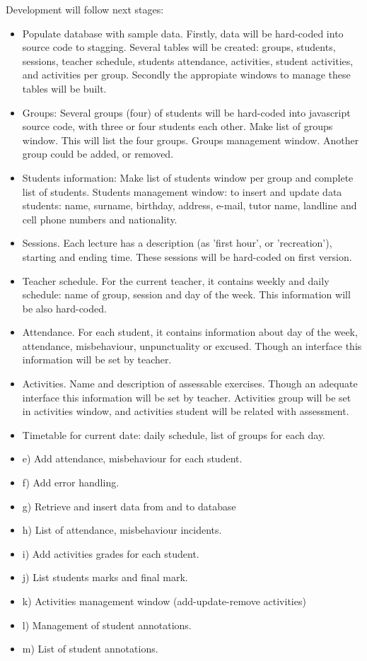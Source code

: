 		
  Development will follow next stages:
	\begin{itemize}
  \item   Populate database with sample data. Firstly, data will be hard-coded into source code to stagging. Several tables will be created:
  groups, students, sessions, teacher schedule, students attendance, activities, student activities, and activities per group. Secondly 
  the appropiate windows to manage these tables will be built.
  \item   Groups: Several groups (four) of students will be hard-coded into javascript source code, with three or four students each other.
  \subitem  Make list of groups window. This will list the four groups.
  \subitem  Groups management window. Another group could be added, or removed.
  \item  Students information:
  \subitem   Make list of students window per group and complete list of students. 
  \subitem   Students management window: to insert and update data students: name, surname, birthday, address, e-mail,  tutor name,
    landline and cell phone numbers and nationality.
  \item  Sessions. Each lecture has a description (as 'first hour', or 'recreation'), starting and ending time.  These sessions will be hard-coded on first version.
  \item  Teacher schedule. For the current teacher, it contains weekly and daily schedule: name of group, session and day of the week. This information will be also hard-coded. 
  \item  Attendance. For each student, it contains information about day of the week, attendance, misbehaviour, unpunctuality or excused. 
  Though an interface this information will be set by teacher. 
  \item  Activities. Name and description of assessable exercises. Though an adequate interface this information will be set by teacher. 
  \subitem  Activities group will be set in activities window, and activities student will be related with assessment.
  \item Timetable for current date: daily schedule, list of groups for each day.
  \item    e) Add attendance, misbehaviour for each student.
  \item    f) Add error handling.
  \item    g) Retrieve and insert data from and to database
  \item    h) List of attendance, misbehaviour incidents.
  \item    i) Add activities grades for each student.
  \item    j) List students marks and final mark.
  \item    k) Activities management window (add-update-remove activities)
  \item    l) Management of student annotations.
  \item    m) List of student annotations. 
  \end{itemize}
  
